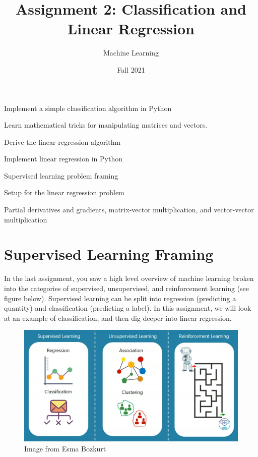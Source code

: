 \documentclass[assignment02_Solutions]{subfiles}
\title{Assignment 2: Classification and Linear Regression}
\author{Machine Learning}
\date{Fall 2021}
\begin{document}
\maketitle
\thispagestyle{firstpage}



\begin{learningobjectives}
\bi
\item Implement a simple classification algorithm in Python
\item Learn mathematical tricks for manipulating matrices and vectors.
\item Derive the linear regression algorithm
\item Implement linear regression in Python
\ei
\end{learningobjectives}

\begin{priorknowledge}
\bi
\item Supervised learning problem framing
\item Setup for the linear regression problem
\item Partial derivatives and gradients, matrix-vector multiplication, and vector-vector multiplication
\ei
\end{priorknowledge}

\section{Supervised Learning Framing}

In the last assignment, you saw a high level overview of machine learning broken into the categories of supervised, unsupervised, and reinforcement learning (see figure below). Supervised learning can be split into regression (predicting a quantity) and classification (predicting a label). In this assignment, we will look at an example of classification, and then dig deeper into linear regression. 

\begin{figure}
\includegraphics[width=0.6\linewidth]{figures/SupervisedUnsupervisedReinforcement}
\centering
\caption{Image from Esma Bozkurt}%
\centering
\end{figure}
\end{document}
